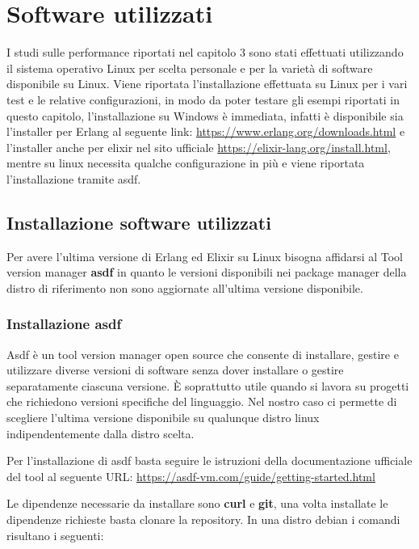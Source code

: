 \section{Software utilizzati}

I studi sulle performance riportati nel capitolo 3
sono stati effettuati
utilizzando il sistema operativo Linux per scelta personale e
per la varietà di software disponibile su Linux.
Viene riportata l'installazione effettuata su Linux per i vari test e le
relative configurazioni, in modo da poter testare gli esempi
riportati in questo capitolo, l'installazione su Windows è immediata,
infatti è disponibile sia l'installer per Erlang al seguente link: \url{https://www.erlang.org/downloads.html}
e l'installer anche per elixir nel sito ufficiale \url{https://elixir-lang.org/install.html},
mentre su linux necessita qualche configurazione in più e viene riportata
l'installazione tramite asdf.

\subsection{Installazione software utilizzati} 

Per avere l'ultima versione di Erlang ed Elixir
su Linux bisogna affidarsi al Tool version manager \textbf{asdf}
in quanto le versioni disponibili nei
package manager della distro di riferimento non sono
aggiornate all'ultima versione disponibile.
\subsubsection{Installazione asdf}

Asdf è un tool version manager open source che consente di installare,
gestire e utilizzare diverse versioni di software senza dover
installare o gestire separatamente ciascuna versione. È soprattutto
utile quando si lavora su progetti che richiedono versioni specifiche
del linguaggio. Nel nostro caso ci permette di scegliere l'ultima
versione disponibile su qualunque distro linux indipendentemente
dalla distro scelta.

Per l'installazione di asdf basta seguire le istruzioni della
documentazione ufficiale del tool al seguente URL: \url{https://asdf-vm.com/guide/getting-started.html}

Le dipendenze necessarie da installare sono \textbf{curl} e \textbf{git},
una volta installate le dipendenze richieste basta clonare la repository.
In una distro debian i comandi risultano i seguenti:

